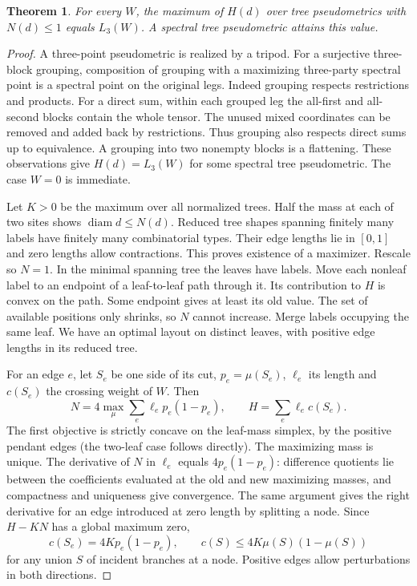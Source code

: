 \documentclass[11pt,a4paper]{article}
\newtheorem{theorem}{Theorem}[section]
\theoremstyle{definition}
\newcommand{\diam}{\operatorname{diam}}
\begin{document}
\begin{theorem}\label{thm:tree}
For every \(W\), the maximum of \(H(d)\) over tree pseudometrics with \(N(d)\le1\) equals \(L_3(W)\). A spectral tree pseudometric attains this value.
\end{theorem}
\begin{proof}
A three-point pseudometric is realized by a tripod. For a surjective three-block grouping, composition of grouping with a maximizing three-party spectral point is a spectral point on the original legs. Indeed grouping respects restrictions and products. For a direct sum, within each grouped leg the all-first and all-second blocks contain the whole tensor. The unused mixed coordinates can be removed and added back by restrictions. Thus grouping also respects direct sums up to equivalence. A grouping into two nonempty blocks is a flattening. These observations give \(H(d)=L_3(W)\) for some spectral tree pseudometric. The case \(W=0\) is immediate.

Let \(K>0\) be the maximum over all normalized trees. Half the mass at each of two sites shows \(\diam d\le N(d)\). Reduced tree shapes spanning finitely many labels have finitely many combinatorial types. Their edge lengths lie in \([0,1]\) and zero lengths allow contractions. This proves existence of a maximizer. Rescale so \(N=1\). In the minimal spanning tree the leaves have labels. Move each nonleaf label to an endpoint of a leaf-to-leaf path through it. Its contribution to \(H\) is convex on the path. Some endpoint gives at least its old value. The set of available positions only shrinks, so \(N\) cannot increase. Merge labels occupying the same leaf. We have an optimal layout on distinct leaves, with positive edge lengths in its reduced tree.

For an edge \(e\), let \(S_e\) be one side of its cut, \(p_e=\mu(S_e)\), \(\ell_e\) its length and \(c(S_e)\) the crossing weight of \(W\). Then
\[
 N=4\max_\mu\sum_e\ell_ep_e(1-p_e),\qquad H=\sum_e\ell_e c(S_e).
\]
The first objective is strictly concave on the leaf-mass simplex, by the positive pendant edges (the two-leaf case follows directly). The maximizing mass is unique. The derivative of \(N\) in \(\ell_e\) equals \(4p_e(1-p_e)\): difference quotients lie between the coefficients evaluated at the old and new maximizing masses, and compactness and uniqueness give convergence. The same argument gives the right derivative for an edge introduced at zero length by splitting a node. Since \(H-KN\) has a global maximum zero,
\[
 c(S_e)=4Kp_e(1-p_e),\qquad
 c(S)\le4K\mu(S)(1-\mu(S))
\]
for any union \(S\) of incident branches at a node. Positive edges allow perturbations in both directions.


\end{proof}
\end{document}
